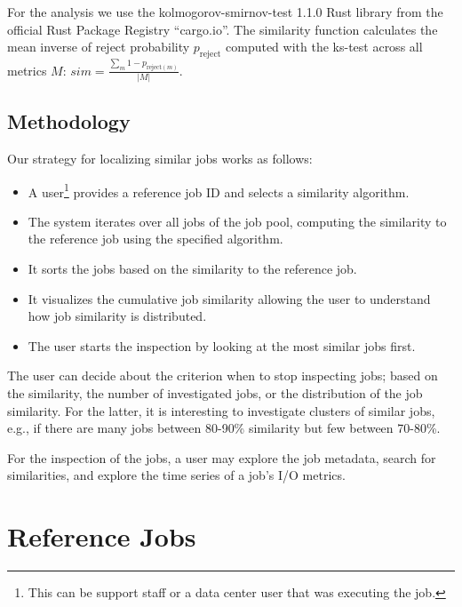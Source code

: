 \documentclass{jhps}
\begin{document}

For the analysis we use the kolmogorov-smirnov-test 1.1.0 Rust library from the official Rust Package Registry ``cargo.io''.
The similarity function calculates the mean inverse of reject probability $p_{\text{reject}}$ computed with the ks-test across all metrics $M$: $sim = \frac{\sum_m 1 - p_{\text{reject}(m)}}{|M|}$.





\subsection{Methodology}
Our strategy for localizing similar jobs works as follows:
\begin{itemize}
  \item A user\footnote{This can be support staff or a data center user that was executing the job.} provides a reference job ID and selects a similarity algorithm.
  \item The system iterates over all jobs of the job pool, computing the similarity to the reference job using the specified algorithm.
  \item It sorts the jobs based on the similarity to the reference job.
  \item It visualizes the cumulative job similarity allowing the user to understand how job similarity is distributed.
  \item The user starts the inspection by looking at the most similar jobs first.
\end{itemize}
The user can decide about the criterion when to stop inspecting jobs; based on the similarity, the number of investigated jobs, or the distribution of the job similarity.
For the latter, it is interesting to investigate clusters of similar jobs, e.g., if there are many jobs between 80-90\% similarity but few between 70-80\%.

For the inspection of the jobs, a user may explore the job metadata, search for similarities, and explore the time series of a job's I/O metrics.

\section{Reference Jobs}%
\label{sec:refjobs}
\end{document}
